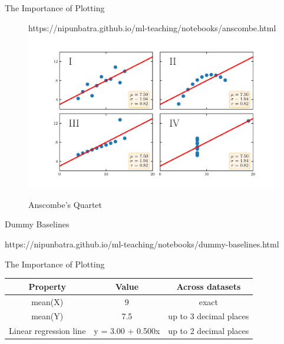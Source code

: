 \documentclass[usenames,dvipsnames]{beamer}
\begin{document}
\begin{frame}{The Importance of Plotting}
    \begin{figure}[htp]
      \centering
      \begin{notebookbox}{https://nipunbatra.github.io/ml-teaching/notebooks/anscombe.html}
        \includegraphics[width=\linewidth]{../assets/accuracy-convention/figures/anscombe.pdf}
      \end{notebookbox}
      \caption{Anscombe’s Quartet}
    \end{figure}
  \end{frame}

  \begin{frame}{Dummy Baselines}
	\begin{notebookbox}{https://nipunbatra.github.io/ml-teaching/notebooks/dummy-baselines.html}
	  \end{notebookbox}
\end{frame}

\begin{frame}{The Importance of Plotting}
\begin{tabular}{|c|c|c|}
\hline 
Property & Value & Across datasets \\ 
\hline 
mean(X) & 9 & exact \\ 
mean(Y) & 7.5 & up to 3 decimal places \\ 
Linear regression line & 	y = 3.00 + 0.500x & up to 2 decimal places \\ 
\hline 
\end{tabular} 


\end{frame}
\end{document}
